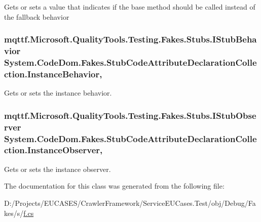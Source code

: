 Gets or sets a value that indicates if the base method should be called instead of the fallback behavior

\hypertarget{class_system_1_1_code_dom_1_1_fakes_1_1_stub_code_attribute_declaration_collection_a32945ae123d307b1845c79b0fc7af160}{
\subsubsection[{Instance\-Behavior}]{\setlength{\rightskip}{0pt plus 5cm}mqttf.\-Microsoft.\-Quality\-Tools.\-Testing.\-Fakes.\-Stubs.\-I\-Stub\-Behavior System.\-Code\-Dom.\-Fakes.\-Stub\-Code\-Attribute\-Declaration\-Collection.\-Instance\-Behavior\hspace{0.3cm}{\ttfamily [get]}, {\ttfamily [set]}}}\label{class_system_1_1_code_dom_1_1_fakes_1_1_stub_code_attribute_declaration_collection_a32945ae123d307b1845c79b0fc7af160}


Gets or sets the instance behavior.

\hypertarget{class_system_1_1_code_dom_1_1_fakes_1_1_stub_code_attribute_declaration_collection_a2756d2957578fe6647f2808893e807c4}{
\subsubsection[{Instance\-Observer}]{\setlength{\rightskip}{0pt plus 5cm}mqttf.\-Microsoft.\-Quality\-Tools.\-Testing.\-Fakes.\-Stubs.\-I\-Stub\-Observer System.\-Code\-Dom.\-Fakes.\-Stub\-Code\-Attribute\-Declaration\-Collection.\-Instance\-Observer\hspace{0.3cm}{\ttfamily [get]}, {\ttfamily [set]}}}\label{class_system_1_1_code_dom_1_1_fakes_1_1_stub_code_attribute_declaration_collection_a2756d2957578fe6647f2808893e807c4}


Gets or sets the instance observer.



The documentation for this class was generated from the following file\-:\begin{DoxyCompactItemize}
\item 
D\-:/\-Projects/\-E\-U\-C\-A\-S\-E\-S/\-Crawler\-Framework/\-Service\-E\-U\-Cases.\-Test/obj/\-Debug/\-Fakes/s/\hyperlink{s_2f_8cs}{f.\-cs}\end{DoxyCompactItemize}
